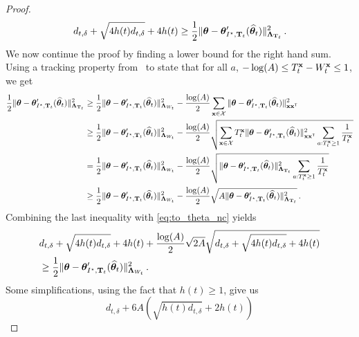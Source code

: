 \begin{proof}
\begin{equation}
\label{eq:to_theta_nc}
d_{t,\delta} + \sqrt{4 h(t) d_{t,\delta}} +4h(t) \geq \frac{1}{2} \Vert {\boldsymbol \theta} - {\boldsymbol \theta}'_{I^\star,{\bf T}_t}(\widehat{{\boldsymbol \theta}}_t) \Vert_{{\boldsymbol \Lambda}_{{\bf T}_t}}^2 \,.
\end{equation}
We now continue the proof by finding a lower bound for the right hand sum. Using a tracking property from~\cite{degenne2020structure} to state that for all $a$, $- \log(A) \le T_t^{{\bf x}} - W_t^{{\bf x}}\le 1$, we get
\begin{align*}
\frac{1}{2} \Vert {\boldsymbol \theta} - {\boldsymbol \theta}'_{I^\star,{\bf T}_t}(\widehat{{\boldsymbol \theta}}_t) \Vert_{{\boldsymbol \Lambda}_{{\bf T}_t}}^2
&\ge \frac{1}{2} \Vert {\boldsymbol \theta} - {\boldsymbol \theta}'_{I^\star,{\bf T}_t}(\widehat{{\boldsymbol \theta}}_t) \Vert_{{\boldsymbol \Lambda}_{W_t}}^2
	- \frac{\log(A)}{2} \sum_{{\bf x}\in\mathcal{X}} \Vert {\boldsymbol \theta} - {\boldsymbol \theta}'_{I^\star,{\bf T}_t}(\widehat{{\boldsymbol \theta}}_t) \Vert_{{\bf x}{\bf x}^\mathsf{\scriptscriptstyle T}}^2
\\
&\ge \frac{1}{2} \Vert {\boldsymbol \theta} - {\boldsymbol \theta}'_{I^\star,{\bf T}_t}(\widehat{{\boldsymbol \theta}}_t) \Vert_{{\boldsymbol \Lambda}_{W_t}}^2
	- \frac{\log(A)}{2} \sqrt{\sum_{{\bf x}\in\mathcal{X}} T_t^{{\bf x}}\Vert {\boldsymbol \theta} - {\boldsymbol \theta}'_{I^\star,{\bf T}_t}(\widehat{{\boldsymbol \theta}}_t) \Vert_{{\bf x}{\bf x}^\mathsf{\scriptscriptstyle T}}^2\sum_{a:T_t^{\bf x}\ge 1} \frac{1}{T_t^{\bf x}}   }
\\
&=   \frac{1}{2} \Vert {\boldsymbol \theta} - {\boldsymbol \theta}'_{I^\star,{\bf T}_t}(\widehat{{\boldsymbol \theta}}_t) \Vert_{{\boldsymbol \Lambda}_{W_t}}^2
	- \frac{\log(A)}{2} \sqrt{\Vert {\boldsymbol \theta} - {\boldsymbol \theta}'_{I^\star,{\bf T}_t}(\widehat{{\boldsymbol \theta}}_t) \Vert_{{\boldsymbol \Lambda}_{{\bf T}_t}}^2\sum_{a:T_t^{\bf x}\ge 1} \frac{1}{T_t^{\bf x}}   }
\\
&\ge \frac{1}{2} \Vert {\boldsymbol \theta} - {\boldsymbol \theta}'_{I^\star,{\bf T}_t}(\widehat{{\boldsymbol \theta}}_t) \Vert_{{\boldsymbol \Lambda}_{W_t}}^2
	-\frac{\log(A)}{2} \sqrt{ A \Vert {\boldsymbol \theta} - {\boldsymbol \theta}'_{I^\star,{\bf T}_t}(\widehat{{\boldsymbol \theta}}_t) \Vert_{{\boldsymbol \Lambda}_{{\bf T}_t}}^2  }\,.
\end{align*}
Combining the last inequality with \eqref{eq:to_theta_nc} yields
\begin{align*}
    &d_{t,\delta} + \sqrt{4 h(t) d_{t,\delta}} +4h(t)+\frac{\log(A)}{2} \sqrt{2 A}\sqrt{d_{t,\delta} + \sqrt{4 h(t) d_{t,\delta}} +4h(t)}\\
    &\geq \frac{1}{2} \Vert {\boldsymbol \theta} - {\boldsymbol \theta}'_{I^\star,{\bf T}_t}(\widehat{{\boldsymbol \theta}}_t) \Vert_{{\boldsymbol \Lambda}_{W_t}}^2\,.
\end{align*}
Some simplifications, using the fact that $h(t)\geq 1 $, give us
\begin{equation}
  \label{eq:to_tW_nc}
  d_{t,\delta}+6A\left( \sqrt{h(t)d_{t,\delta}}+2h(t)\right)

\end{equation}
\end{proof}
